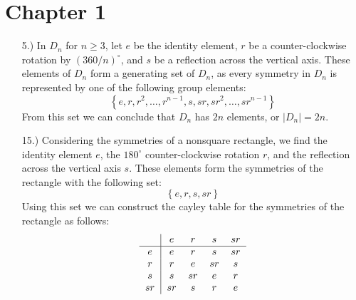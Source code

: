 \documentclass[12pt]{article}
\newcommand{\vertb}[1]{\left\vert#1\right\vert}      %
\newcommand{\braces}[1]{\left\{#1\right\}}           %
\begin{document}
\pagestyle{fancy}
\fancyhead{}

\normalsize

\section*{Chapter 1}
\begin{itemize}
    \item [5.)] In $D_n$ for $n\ge3$, let $e$ be the identity element, $r$ be a counter-clockwise rotation by $(360/n)^\circ$, and $s$ be a reflection across the vertical axis. These elements of $D_n$ form a generating set of $D_n$, as every symmetry in $D_n$ is represented by one of the following group elements:
    \[\braces{e,r,r^2,\dots,r^{n-1},s,sr,sr^2,\dots,sr^{n-1}}\]
    From this set we can conclude that $D_n$ has $2n$ elements, or $\vertb{D_n}=2n$.

    \item [15.)] Considering the symmetries of a nonsquare rectangle, we find the identity element $e$, the $180^\circ$ counter-clockwise rotation $r$, and the reflection across the vertical axis $s$. These elements form the symmetries of the rectangle with the following set:
    \[\braces{e,r,s,sr}\]
    Using this set we can construct the cayley table for the symmetries of the rectangle as follows:
    \[
        \begin{tabular}{c|cccc}
            & $e$ & $r$ & $s$ & $sr$ \\
            \hline
            $e$ & $e$ & $r$ & $s$ & $sr$ \\
            $r$ & $r$ & $e$ & $sr$ & $s$ \\
            $s$ & $s$ & $sr$ & $e$ & $r$ \\
            $sr$ & $sr$ & $s$ & $r$ & $e$
        \end{tabular}
    \]

\end{itemize}
\end{document}
